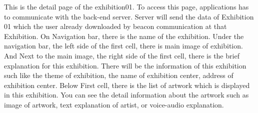 \documentclass[conference]{IEEEtran}
\begin{document}
This is the detail page of the exhibition01. To access this page, applications has to communicate with the back-end server. Server will send the data of Exhibition 01 which the user already downloaded by beacon communication at that Exhibition. On Navigation bar, there is the name of the exhibition. Under the navigation bar, the left side of the first cell,  there is main image of exhibition. And Next to the main image, the right side of the first cell, there is the brief explanation for this exhibition. There will be the information of this exhibition such like the theme of exhibition, the name of exhibition center, address of exhibition center. Below First cell, there is the list of artwork which is displayed in this exhibition.  You can see the detail information about the artwork such as image of artwork, text explanation of artist, or voice-audio explanation. \\\\
\end{document}
